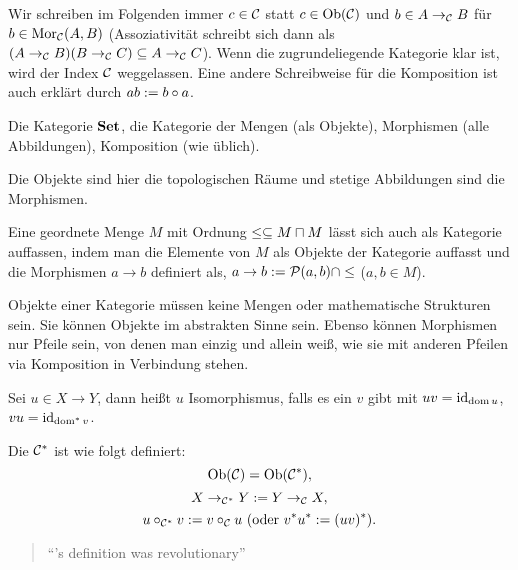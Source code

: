 \documentclass{book}
\begin{document}
\begin{remark}
    Wir schreiben im Folgenden immer $c\in\mathcal{C}$ statt $c\in\mathop\mathrm{Ob}(\mathcal{C})$ und $b\in A\rightarrow_{\mathcal{C}} B$ für $b\in\mathop\mathrm{Mor}\nolimits_{\mathcal{C}}(A,B)$ (Assoziativität schreibt sich dann als $(A\rightarrow_{\mathcal{C}} B)(B\rightarrow_{\mathcal{C}} C)\subseteq A\rightarrow_{\mathcal{C}} C$). Wenn die zugrundeliegende Kategorie klar ist, wird der Index $\mathcal{C}$ weggelassen. Eine andere Schreibweise für die Komposition ist auch erklärt durch $ab:=b\circ a$.
\end{remark}

\begin{example}
    Die Kategorie $\mathbf{Set}$, die Kategorie der Mengen (als Objekte), Morphismen (alle Abbildungen), Komposition (wie üblich).
\end{example}

\begin{example}
    Die Objekte sind hier die topologischen Räume und stetige Abbildungen sind die Morphismen.
\end{example}

\begin{example}
    Eine geordnete Menge $M$ mit Ordnung $\leq\setleq M\setprod M$ lässt sich auch als Kategorie auffassen, indem man die Elemente von $M$ als Objekte der Kategorie auffasst und die Morphismen $a\to b$ definiert als, $a\to b:=\set{(a,b)}\setmeet\leq$ ($a,b\in M$).
\end{example}

\begin{remark}
    Objekte einer Kategorie müssen keine Mengen oder mathematische Strukturen sein. Sie können Objekte im abstrakten Sinne sein. Ebenso können Morphismen nur Pfeile sein, von denen man einzig und allein weiß, wie sie mit anderen Pfeilen via Komposition in Verbindung stehen.
\end{remark}

\begin{definition}[Isomorphismus]
    Sei $u\in X\to Y$, dann heißt $u$ Isomorphismus, falls es ein $v$ gibt mit $uv=\mathop\mathrm{id}\nolimits_{\mathop\mathrm{dom}\nolimits u}$, $vu=\mathop\mathrm{id}\nolimits_{\mathop{\mathrm{dom}^\ast}\nolimits v}$.
\end{definition}

\begin{definition}
    Die  $\mathcal{C}^{\ast}$ ist wie folgt definiert:
    $$
    \mathop\mathrm{Ob}(\mathcal{C})=\mathop\mathrm{Ob}(\mathcal{C}^{\ast}),
    $$
    $$
    X\rightarrow_{\mathcal{C}^{\ast}} Y:=Y\rightarrow_{\mathcal{C}} X,
    $$
    $$
    u\circ_{\mathcal{C}^{\ast}} v:=v\circ_{\mathcal{C}} u\text{ (oder $v^{\ast}u^{\ast}:=(uv)^{\ast}$)}.
    $$
\end{definition}
%
\begin{quotation}
    ``'s definition was revolutionary'' 
\end{quotation}
\end{document}
